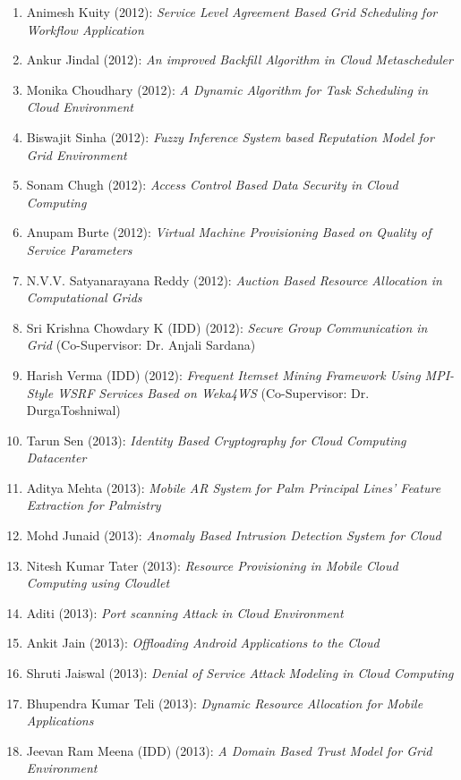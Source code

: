 \begin{enumerate} [label=(MT\arabic*).]	
\item	Animesh Kuity (2012): 	\textit{Service Level Agreement Based Grid Scheduling for Workflow Application}
\item	Ankur Jindal (2012): 	\textit{	An improved Backfill Algorithm in Cloud Metascheduler}
\item	Monika Choudhary (2012): 	\textit{	A Dynamic Algorithm for Task Scheduling in Cloud Environment}	
\item	Biswajit Sinha (2012): 	\textit{	Fuzzy Inference System based Reputation Model for Grid Environment} 
\item	Sonam Chugh (2012): 	\textit{	Access Control Based Data Security in Cloud Computing} 
\item	Anupam Burte (2012): 	\textit{	Virtual Machine Provisioning Based on Quality of Service Parameters}	
\item	N.V.V. Satyanarayana Reddy (2012): 	\textit{	Auction Based Resource Allocation in Computational Grids	} 
\item   Sri Krishna Chowdary K (IDD) (2012): 	\textit{	Secure Group Communication in Grid}  (Co-Supervisor: Dr. Anjali Sardana) 
\item	Harish Verma (IDD) (2012): 	\textit{	Frequent Itemset Mining Framework Using MPI-Style WSRF Services Based on Weka4WS} (Co-Supervisor: Dr. DurgaToshniwal)
\item	Tarun Sen (2013): 	\textit{	Identity Based Cryptography for Cloud Computing Datacenter}	 
\item	Aditya Mehta (2013): 	\textit{	Mobile AR System for Palm Principal Lines' Feature Extraction for Palmistry} 
\item		Mohd Junaid (2013): 	\textit{	Anomaly Based Intrusion Detection System for Cloud}	
\item		Nitesh Kumar Tater (2013): 	\textit{	Resource Provisioning in Mobile Cloud Computing using Cloudlet}
\item		Aditi (2013): 	\textit{	Port scanning Attack in Cloud Environment} 
\item		Ankit Jain (2013): 	\textit{	Offloading Android Applications to the Cloud}
\item		Shruti Jaiswal (2013): 	\textit{	Denial of Service Attack Modeling in Cloud Computing}
\item		Bhupendra Kumar Teli (2013): 	\textit{	Dynamic Resource Allocation for Mobile Applications}
\item		Jeevan Ram Meena (IDD) (2013): 	\textit{	A Domain Based Trust Model for Grid Environment}

\end{enumerate}
